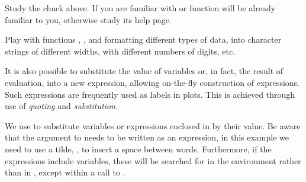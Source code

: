 \documentclass[krantz2]{krantz}\usepackage{knitr}%
\begin{document}
\begin{knitrout}\footnotesize
{}\color{fgcolor}
\end{knitrout}

\begin{playground}
Study the chuck above. If you are familiar with  or  function  will be already familiar to you, otherwise study its help page.

Play with functions , , and  formatting different types of data, into character strings of different widths, with different numbers of digits, etc.
\end{playground}

It is also possible to substitute the value of variables or, in fact, the result of evaluation, into a new expression, allowing on-the-fly construction of expressions. Such expressions are frequently used as labels in plots. This is achieved through use of \emph{quoting} and \emph{substitution}.

We use  to substitute variables or expressions enclosed in  by their value. Be aware that the argument to  needs to be written as an expression, in this example we need to use a tilde, \code{\textasciitilde}, to insert a space between words. Furthermore, if the expressions include variables, these will be searched for in the environment rather than in , except within a call to .
\end{document}
